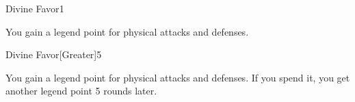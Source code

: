 \begin{spellsection}{Divine Favor}{1}
    \begin{spellheader}
        \spelldur \durshort
    \end{spellheader}
    \begin{spellcontent}
        \begin{spelltargetinginfo}
        \end{spelltargetinginfo}
        \begin{spelleffects}
            \spelleffect You gain a legend point for physical attacks and defenses.
            \spelldur \durshort \dismissable
        \end{spelleffects}
    \end{spellcontent}
    \begin{spellfooter}
        \miscastexplode
    \end{spellfooter}
\end{spellsection}

\begin{spellsection}{Divine Favor}[Greater]{5}
    \begin{spellheader}
    \end{spellheader}
    \begin{spellcontent}
        \begin{spelltargetinginfo}
        \end{spelltargetinginfo}
        \begin{spelleffects}
            \spelleffect You gain a legend point for physical attacks and defenses. If you spend it, you get another legend point 5 rounds later.
            \spelldur \durlong \dismissable
        \end{spelleffects}
    \end{spellcontent}
    \begin{spellfooter}
        \miscastexplode
    \end{spellfooter}
\end{spellsection}

